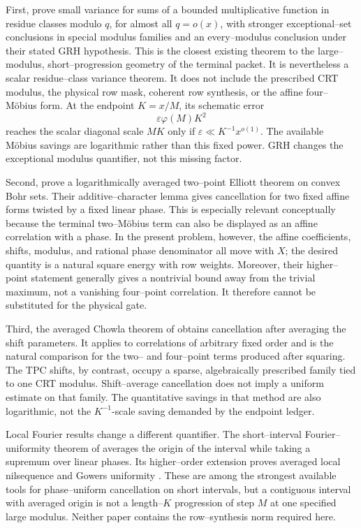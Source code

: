 First, \citet{KlurmanMangerelTeravainen2023} prove small variance for sums
of a bounded multiplicative function in residue classes modulo \(q\), for
almost all \(q=o(x)\), with stronger exceptional--set conclusions in
special modulus families and an every--modulus conclusion under their
stated GRH hypothesis.  This is the closest existing theorem to the
large--modulus, short--progression geometry of the terminal packet.  It is
nevertheless a scalar residue--class variance theorem.  It does not
include the prescribed CRT modulus, the physical row mask, coherent row
synthesis, or the affine four--M\"obius form.  At the endpoint \(K=x/M\),
its schematic error
\begin{equation}
 \varepsilon\varphi(M)K^2
 \label{eq:tpc40-KMT-schematic-error}
\end{equation}
reaches the scalar diagonal scale \(MK\) only if
\(\varepsilon\ll K^{-1}x^{o(1)}\).  The available M\"obius savings are
logarithmic rather than this fixed power.  GRH changes the exceptional
modulus quantifier, not this missing factor.

Second, \citet{TeravainenWalker2025} prove a logarithmically averaged
two--point Elliott theorem on convex Bohr sets.  Their additive--character
lemma gives cancellation for two fixed affine forms twisted by a fixed
linear phase.  This is especially relevant conceptually because the
terminal two--M\"obius term can also be displayed as an affine correlation
with a phase.  In the present problem, however, the affine coefficients,
shifts, modulus, and rational phase denominator all move with \(X\); the
desired quantity is a natural square energy with row weights.  Moreover,
their higher--point statement generally gives a nontrivial bound away from
the trivial maximum, not a vanishing four--point correlation.  It therefore
cannot be substituted for the physical gate.

Third, the averaged Chowla theorem of
\citet{MatomakiRadziwillTao2015} obtains cancellation after averaging the
shift parameters.  It applies to correlations of arbitrary fixed order
and is the natural comparison for the two-- and four--point terms produced
after squaring.  The TPC shifts, by contrast, occupy a sparse,
algebraically prescribed family tied to one CRT modulus.  Shift--average
cancellation does not imply a uniform estimate on that family.  The
quantitative savings in that method are also logarithmic, not the
\(K^{-1}\)-scale saving demanded by the endpoint ledger.

Local Fourier results change a different quantifier.  The short--interval
Fourier--uniformity theorem of \citet{MatomakiRadziwillTao2020} averages
the origin of the interval while taking a supremum over linear phases.  Its
higher--order extension proves averaged local nilsequence and Gowers
uniformity \citep{MatomakiRadziwillTaoTeravainenZiegler2023}.  These are
among the strongest available tools for phase--uniform cancellation on
short intervals, but a contiguous interval with averaged origin is not a
length--\(K\) progression of step \(M\) at one specified large modulus.
Neither paper contains the row--synthesis norm required here.

